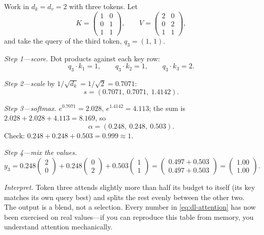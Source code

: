 \begin{workedexample}
Work in $d_k = d_v = 2$ with three tokens. Let
\[
  K = \begin{pmatrix} 1&0\\ 0&1\\ 1&1 \end{pmatrix},
  \qquad
  V = \begin{pmatrix} 2&0\\ 0&2\\ 1&1 \end{pmatrix},
\]
and take the query of the third token, $q_3 = (1,\,1)$.

\emph{Step 1---score.} Dot products against each key row:
\[
  q_3\!\cdot\!k_1 = 1,\qquad q_3\!\cdot\!k_2 = 1,\qquad q_3\!\cdot\!k_3 = 2 .
\]

\emph{Step 2---scale} by $1/\sqrt{d_k} = 1/\sqrt{2} = 0.7071$:
\[
  s = (0.7071,\ 0.7071,\ 1.4142).
\]

\emph{Step 3---softmax.} $e^{0.7071}=2.028$, $e^{1.4142}=4.113$; the sum is
$2.028+2.028+4.113 = 8.169$, so
\[
  \alpha = (0.248,\ 0.248,\ 0.503).
\]
Check: $0.248+0.248+0.503 = 0.999 \approx 1$. \checkmark

\emph{Step 4---mix the values.}
\[
  y_3 = 0.248\begin{pmatrix}2\\0\end{pmatrix}
      + 0.248\begin{pmatrix}0\\2\end{pmatrix}
      + 0.503\begin{pmatrix}1\\1\end{pmatrix}
      = \begin{pmatrix}0.497+0.503\\ 0.497+0.503\end{pmatrix}
      = \begin{pmatrix}1.00\\ 1.00\end{pmatrix}.
\]

\emph{Interpret.} Token three attends slightly more than half its budget to
itself (its key matches its own query best) and splits the rest evenly between
the other two. The output is a blend, not a selection. Every number in
\cref{eq:dl-attention} has now been exercised on real values---if you can
reproduce this table from memory, you understand attention mechanically.
\end{workedexample}

